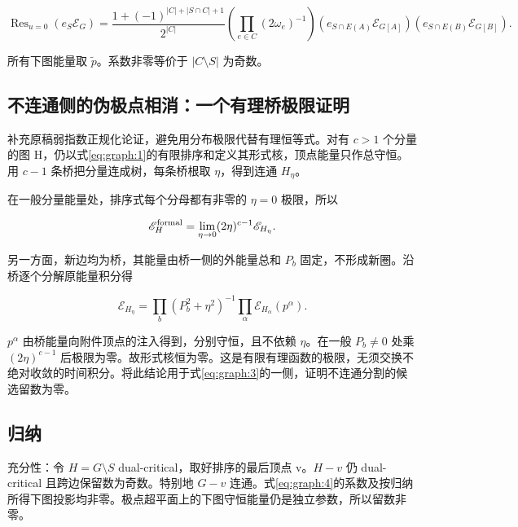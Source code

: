 \documentclass[11pt,a4paper,oneside]{ctexrep}
\theoremstyle{cnplain}
\theoremstyle{definition}
\theoremstyle{remark}
\begin{document}
\begin{equation}
\operatorname{Res}_{u=0}(e_S\mathscr E_G)=
 \frac{1+(-1)^{|C|+|S\cap C|+1}}{2^{|C|}}
 \left(\prod_{e\in C}(2\omega_e)^{-1}\right)
 (e_{S\cap E(A)}\mathscr E_{G[A]})
 (e_{S\cap E(B)}\mathscr E_{G[B]}).                         \label{eq:graph:4}
\end{equation}

所有下图能量取 \(\widetilde p\)。系数非零等价于 \(|C\setminus S|\) 为奇数。

\subsection{不连通侧的伪极点相消：一个有理桥极限证明}\label{sec:graph:2.2}

补充原稿弱指数正规化论证，避免用分布极限代替有理恒等式。对有 \(c>1\) 个分量的图 H，仍以式\eqref{eq:graph:1}的有限排序和定义其形式核，顶点能量只作总守恒。用 \(c-1\) 条桥把分量连成树，每条桥根取 \(\eta\)，得到连通 \(H_\eta\)。

在一般分量能量处，排序式每个分母都有非零的 \(\eta=0\) 极限，所以

\begin{equation}
\mathscr E_H^{\rm formal}
 =\lim_{\eta\to0}(2\eta)^{c-1}\mathscr E_{H_\eta}.          \label{eq:graph:5}
\end{equation}

另一方面，新边均为桥，其能量由桥一侧的外能量总和 \(P_b\) 固定，不形成新圈。沿桥逐个分解原能量积分得

\begin{equation}
\mathscr E_{H_\eta}
 =\prod_b(P_b^2+\eta^2)^{-1}
   \prod_\alpha\mathscr E_{H_\alpha}(p^\alpha).
\end{equation}

\(p^\alpha\) 由桥能量向附件顶点的注入得到，分别守恒，且不依赖 \(\eta\)。在一般 \(P_b\ne0\) 处乘 \((2\eta)^{c-1}\) 后极限为零。故形式核恒为零。这是有限有理函数的极限，无须交换不绝对收敛的时间积分。将此结论用于式\eqref{eq:graph:3}的一侧，证明不连通分割的候选留数为零。

\subsection{归纳}\label{sec:graph:2.3}

充分性：令 \(H=G\setminus S\) dual-critical，取好排序的最后顶点 v。\(H-v\) 仍 dual-critical 且跨边保留数为奇数。特别地 \(G-v\) 连通。式\eqref{eq:graph:4}的系数及按归纳所得下图投影均非零。极点超平面上的下图守恒能量仍是独立参数，所以留数非零。
\end{document}
